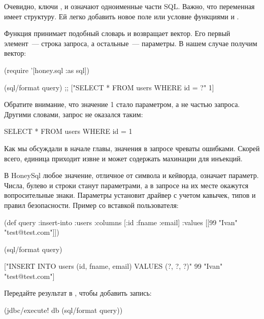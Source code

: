 Очевидно, ключи ,  и  означают одноименные части SQL. Важно, что переменная  имеет структуру. Ей легко добавить новое поле или условие функциями  и .

Функция  принимает подобный словарь и возвращает вектор. Его первый элемент~--- строка запроса, а остальные~--- параметры. В нашем случае получим вектор:

\begin{english}
  \begin{clojure}
(require '[honey.sql :as sql])

(sql/format query)
;; ["SELECT * FROM users WHERE id = ?" 1]
  \end{clojure}
\end{english}

Обратите внимание, что значение 1 стало параметром, а не частью запроса. Другими словами, запрос не оказался таким:

\begin{english}
  \begin{sql}
SELECT * FROM users WHERE id = 1
  \end{sql}
\end{english}

Как мы обсуждали в начале главы, значения в запросе чреваты ошибками. Скорей всего, единица приходит извне и может содержать махинации для инъекций.

В HoneySql любое значение, отличное от символа и кейворда, означает параметр. Числа, булево и строки станут параметрами, а в запросе на их месте окажутся вопросительные знаки. Параметры установит драйвер с учетом кавычек, типов и правил безопасности. Пример со вставкой пользователя:

\begin{english}
  \begin{clojure}
(def query
  {:insert-into :users
   :columns [:id :fname :email]
   :values [[99 "Ivan" "test@test.com"]]})

(sql/format query)

["INSERT INTO users (id, fname, email)
  VALUES (?, ?, ?)"
 99
 "Ivan"
 "test@test.com"]
  \end{clojure}
\end{english}

Передайте результат в , чтобы добавить запись:

\begin{english}
  \begin{clojure}
(jdbc/execute! db (sql/format query))
  \end{clojure}
\end{english}

